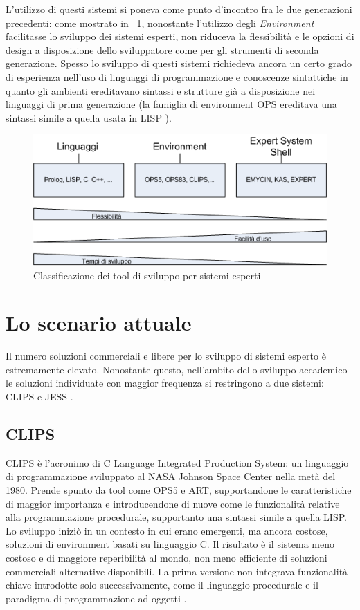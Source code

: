 L'utilizzo di questi sistemi si poneva come punto d'incontro fra le due generazioni precedenti: come mostrato in \figurename~\ref{fig:classificazione-tools}, nonostante l'utilizzo degli \emph{Environment} facilitasse lo sviluppo dei sistemi esperti, non riduceva la flessibilità e le opzioni di design a disposizione dello sviluppatore come per gli strumenti di seconda generazione. Spesso lo sviluppo di questi sistemi richiedeva ancora un certo grado di esperienza nell'uso di linguaggi di programmazione e conoscenze sintattiche in quanto gli ambienti ereditavano sintassi e strutture già a disposizione nei linguaggi di prima generazione (la famiglia di environment OPS ereditava una sintassi simile a quella usata in LISP \cite{brownston1985}).

\begin{figure}
\centering
\includegraphics[scale=0.7]{Immagini/Capitolo1/classificazione-strumenti.png}
\caption{Classificazione dei tool di sviluppo per sistemi esperti}\label{fig:classificazione-tools}
\end{figure}


\section{Lo scenario attuale}
Il numero soluzioni commerciali e libere per lo sviluppo di sistemi esperto è estremamente elevato. Nonostante questo, nell'ambito dello sviluppo accademico le soluzioni individuate con maggior frequenza si restringono a due sistemi: CLIPS e JESS \cite{laerhoven1999}.

\subsection{CLIPS}
CLIPS è l'acronimo di C Language Integrated Production System: un linguaggio di programmazione sviluppato al NASA Johnson Space Center nella metà del 1980. Prende spunto da tool come OPS5 e ART, supportandone le caratteristiche di maggior importanza e introducendone di nuove come le funzionalità relative alla programmazione procedurale, supportanto una sintassi simile a quella LISP. Lo sviluppo iniziò in un contesto in cui erano emergenti, ma ancora costose, soluzioni di environment basati su linguaggio C. Il risultato è il sistema meno costoso e di maggiore reperibilità al mondo, non meno efficiente di soluzioni commerciali alternative disponibili. La prima versione non integrava funzionalità chiave introdotte solo successivamente, come il linguaggio procedurale e il paradigma di programmazione ad oggetti \cite{jackson1999}.

